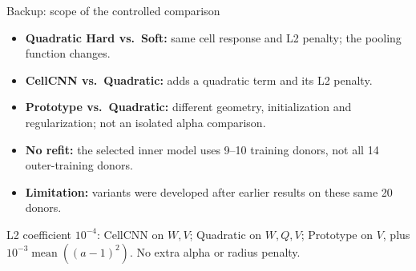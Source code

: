 \documentclass[aspectratio=169,10pt]{beamer}
\begin{document}
\begin{frame}{Backup: scope of the controlled comparison}
  \begin{itemize}
    \item \textbf{Quadratic Hard vs.\ Soft:} same cell response and L2 penalty; the pooling function changes.
    \item \textbf{CellCNN vs.\ Quadratic:} adds a quadratic term and its L2 penalty.
    \item \textbf{Prototype vs.\ Quadratic:} different geometry, initialization and regularization; not an isolated alpha comparison.
    \item \textbf{No refit:} the selected inner model uses 9--10 training donors, not all 14 outer-training donors.
    \item \textbf{Limitation:} variants were developed after earlier results on these same 20 donors.
  \end{itemize}
  {\small L2 coefficient $10^{-4}$: CellCNN on $W,V$; Quadratic on $W,Q,V$; Prototype on $V$, plus $10^{-3}\operatorname{mean}((a-1)^2)$. No extra alpha or radius penalty.\par}
  \takeaway{\FinalTakeaway}
\end{frame}
\end{document}
